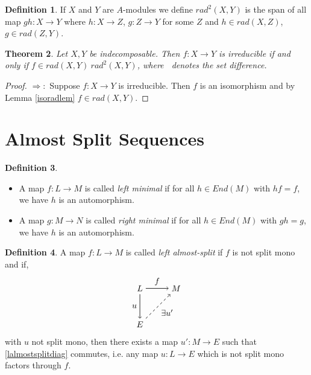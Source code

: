 \documentclass[11.5pt, twoside, a4paper, titlepage]{report}
\theoremstyle{definition}
\newtheorem{mydef}{Definition}[section]
\theoremstyle{plain}
\newtheorem{thm}[mydef]{Theorem}
\begin{document}

\begin{mydef}
If $X$ and $Y$ are $A$-modules we define $rad^2(X,Y)$ is the span of all map $gh:X \to Y$ where $h: X \to Z$, $g: Z \to Y$ for some $Z$ and $h \in rad(X,Z)$, $g\in rad(Z, Y)$.
\end{mydef}

\begin{thm}
Let $X,Y$ be indecomposable. Then $f: X \to Y$ is irreducible if and only if $f \in rad(X,Y)\ rad^2(X,Y)$, where $\ $ denotes the set difference.
\end{thm}
\begin{proof}
$\Rightarrow:$ Suppose $f: X \to Y$ is irreducible. Then $f$ is an isomorphism and by Lemma \ref{isoradlem} $f\in rad(X,Y)$.
\end{proof}


\section{Almost Split Sequences}

\begin{mydef}
\begin{itemize}
\item A map $f: L \to M$ is called \emph{left minimal} if for all $h\in End(M)$ with $hf=f$, we have $h$ is an automorphism.
\item A map $g: M \to N$ is called \emph{right minimal} if for all $h\in End(M)$ with $gh=g$, we have $h$ is an automorphism.
\end{itemize}
\end{mydef}

\begin{mydef}
A map $f: L \to M$ is called \emph{left almost-split} if $f$ is not split mono and if,
\begin{equation} \label{lalmostsplitdiag}
\begin{tikzpicture}[->,-latex, auto, main path/.style={->, semithick}, main node/.style={}]
\node	[main node]		(1) at (0,0)		{$L$};
\node [main node]		(2) at (1.5,0)	{$M$};
\node [main node]		(3) at (0,-1.5)	{$E$};

\draw (1) [main path] edge node [auto] {$f$} (2);
\draw (1) [main path] edge node [auto, swap] {$u$} (3);
\draw (3) [->, dashed, semithick] edge node [auto, swap] {$\exists u'$} (2);
\end{tikzpicture}
\end{equation}
with $u$ not split mono, then there exists a map $u': M \to E$ such that \ref{lalmostsplitdiag} commutes, i.e. any map $u: L \to E$ which is not split mono factors through $f$.
\end{mydef}
\end{document}
